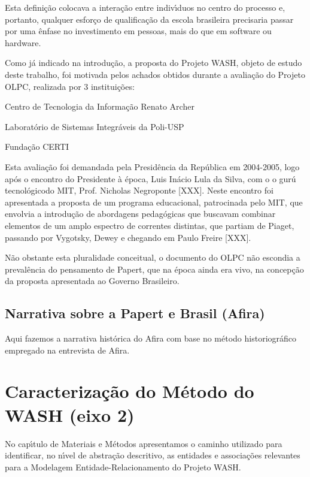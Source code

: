 \documentclass[
12pt,		%
openright,	%
twoside,  %
a4paper,			%
chapter=TITLE,		%
english,			%
french,				%
spanish,			%
brazil				%
]{USPSC-classe/USPSC}
\begin{document}
Esta defini\c{c}\~ao colocava a intera\c{c}\~ao entre indiv\'{\i}duos no centro do processo e, portanto, qualquer esfor\c{c}o de qualifica\c{c}\~ao da escola brasileira precisaria passar por uma \^enfase no investimento em \textquotedbl pessoas, mais do que em software ou hardware\textquotedbl .


Como j\'a indicado na introdu\c{c}\~ao, a proposta do Projeto WASH, objeto de estudo deste trabalho, foi motivada pelos achados obtidos durante a avalia\c{c}\~ao do Projeto OLPC, realizada por 3 institui\c{c}\~oes:



\begin{alineas}
\item Centro de Tecnologia da Informa\c{c}\~ao Renato Archer
\item Laborat\'orio de Sistemas Integr\'aveis da Poli-USP
\item Funda\c{c}\~ao CERTI
\end{alineas}

Esta avalia\c{c}\~ao foi demandada pela Presid\^encia da Rep\'ublica em 2004-2005, logo ap\'os o encontro do Presidente \`a \'epoca, Luis In\'acio Lula da Silva, com o o \textquotedbl gur\'u tecnol\'ogico\textquotedbl  do MIT, Prof. Nicholas Negroponte [XXX]. Neste encontro foi apresentada a proposta de um programa educacional, patrocinada pelo MIT, que envolvia a introdu\c{c}\~ao de abordagens pedag\'ogicas que buscavam combinar elementos de um amplo espectro de correntes distintas, que partiam de Piaget, passando por Vygotsky, Dewey e chegando em Paulo Freire [XXX].


N\~ao obstante esta pluralidade conceitual, o documento do OLPC n\~ao escondia a preval\^encia do pensamento de Papert, que na \'epoca ainda era vivo, na concep\c{c}\~ao da proposta apresentada ao Governo Brasileiro.


\subsection[Narrativa sobre a Papert e Brasil (Afira)]{Narrativa sobre a Papert e Brasil (Afira)}\label{Narrativa sobre a Papert e Brasil (Afira)}
Aqui fazemos a narrativa hist\'orica do Afira com base no m\'etodo historiogr\'afico empregado na entrevista de Afira.


\section[Caracteriza\c{c}\~ao do M\'etodo do WASH (eixo 2)]{Caracteriza\c{c}\~ao do M\'etodo do WASH (eixo 2)}\label{Caracteriza\c{c}\~ao do M\'etodo do WASH (eixo 2)}
No cap\'{\i}tulo de Materiais e M\'etodos apresentamos o caminho utilizado para identificar, no n\'{\i}vel de abstra\c{c}\~ao descritivo, as entidades e associa\c{c}\~oes relevantes para a Modelagem Entidade-Relacionamento do Projeto WASH.
\end{document}
